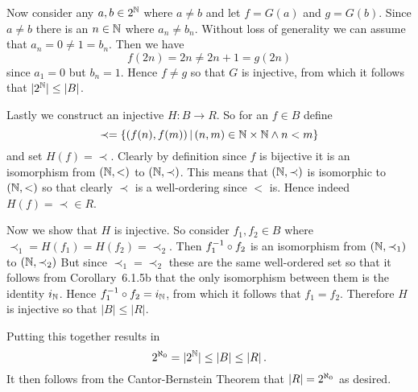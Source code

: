 {{    Now consider any $a, b \in 2^{\mathbb{N}}$ where $a \neq b$ and let $f = G(a)$ and $g = G(b)$.
    Since $a \neq b $ there is an $n \in \mathbb{N}$ where $a_n \neq b_n$.
    Without loss of generality we can assume that $a_n = 0 \neq 1 = b_n$.
    Then we have
    $$
    f(2n) = 2n \neq 2n+1 = g(2n)
    $$
    since $a_1 = 0$ but $b_n = 1$.
    Hence $f \neq g$ so that $G$ is injective, from which it follows that $|2^{\mathbb{N}}| \leq |B|$.

    Lastly we construct an injective $H : B \to R$.
    So for an $f \in B$ define
    $$
    \prec = \left\{ (f(n), f(m)) \,|\, (n,m) \in \mathbb{N} \times \mathbb{N} \land n < m \right\}
    $$
    and set $H(f) = \prec$.
    Clearly by definition since $f$ is bijective it is an isomorphism from $(\mathbb{N}, <)$ to $(\mathbb{N}, \prec)$.
    This means that $(\mathbb{N}, \prec)$ is isomorphic to $(\mathbb{N}, <)$ so that clearly $\prec$ is a well-ordering since $<$ is.
    Hence indeed $H(f) = \prec \in R$.

    Now we show that $H$ is injective.
    So consider $f_1, f_2 \in B$ where $\prec_1 = H(f_1) = H(f_2) = \prec_2$.
    Then $f_1^{-1} \circ f_2$ is an isomorphism from $(\mathbb{N}, \prec_1)$ to $(\mathbb{N}, \prec_2)$
    But since $\prec_1 = \prec_2$ these are the same well-ordered set so that it follows from Corollary~6.1.5b that the only isomorphism between them is the identity $i_{\mathbb{N}}$.
    Hence $f_1^{-1} \circ f_2 = i_{\mathbb{N}}$, from which it follows that $f_1 = f_2$.
    Therefore $H$ is injective so that $|B| \leq |R|$.

    Putting this together results in
    $$
    {2^{\aleph_0}} = |2^{\mathbb{N}}| \leq |B| \leq |R| \,.
    $$
    It then follows from the Cantor-Bernstein Theorem that $|R| = {2^{\aleph_0}}$ as desired.
  }
}

